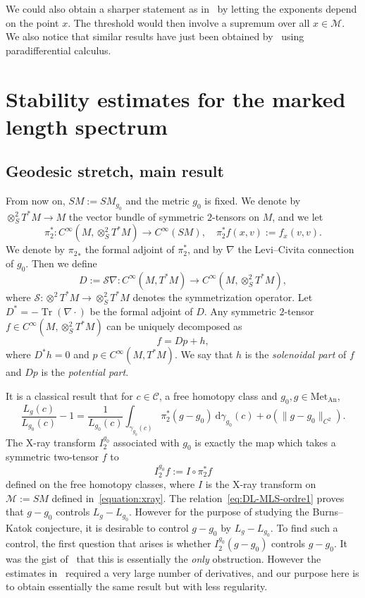 \documentclass[AHL,Unicode,longabstracts,published]{cedram}
\newcommand{\mc}{\mathcal}
\newcommand{\M}{\mathcal{M}}
\newcommand{\clS}{\mathcal{S}}
\newcommand{\dd}{\mathrm{d}}
\newcommand{\Met}{\mathrm{Met}}
\newcommand{\An}{\mathrm{An}}
\DeclareMathOperator{\Tr}{Tr}
\begin{document}
We could also obtain a sharper statement as in~\cite{Hasselblatt-92} by letting the exponents depend on the point $x$. The threshold would then involve a supremum over all $x \in \M$. We also notice that similar results have just been obtained by~\cite{Guillarmou-Poyferre-21} using paradifferential calculus.



\section{Stability estimates for the marked length spectrum}\label{section:mls}

\subsection{Geodesic stretch, main result}

From now on, $SM := SM_{g_0}$ and the metric $g_0$ is fixed. We denote by $\otimes^2_S T^*M \rightarrow M$ the vector bundle of symmetric $2$-tensors on $M$, and we let
\[
\pi_2^* : C^\infty\left(M,\otimes^2_S T^*M\right) \rightarrow C^\infty(SM),\quad\pi_2^* f(x,v) := f_x(v,v).
\]
We denote by ${\pi_2}_*$ the formal adjoint of $\pi_2^\ast$, and by $\nabla$ the Levi--Civita connection of $g_0$. Then we define
\[
D := \clS \nabla : C^\infty\left(M,T^*M\right) \rightarrow C^\infty\left(M,\otimes^2_S T^*M\right),
\]
where $\mc{S} : \otimes^2 T^*M \rightarrow \otimes^2_S T^*M$ denotes the symmetrization operator. Let $D^* = -\Tr(\nabla \cdot)$ be the formal adjoint of $D$. Any symmetric $2$-tensor $f \in C^\infty(M,\otimes^2_S T^*M)$ can be uniquely decomposed as
\[
f = Dp + h,
\]
where $D^*h = 0$ and $p \in C^\infty(M,T^*M)$. We say that $h$ is the \emph{solenoidal part} of $f$ and $Dp$ is the \emph{potential part}.


It is a classical result that for $c \in \mc{C}$, a free homotopy class and $g_0, g\in \Met_{\An}$,
\begin{equation}\label{eq:DL-MLS-ordre1}
\frac{L_g(c)}{L_{g_0}(c)} - 1 = \frac{1}{L_{g_0}(c)} \int_{\gamma_{g_0}(c)} \pi_2^\ast(g-g_0)~\dd \gamma_{g_0}(c) + o\left(\| g - g_0 \|_{C^2}\right).
\end{equation}
The X-ray transform $I_2^{g_0}$ associated with $g_0$ is exactly the map which takes a symmetric two-tensor $f$ to
\[
I_2^{g_0}f := I \circ \pi_2^* f
\]
defined on the free homotopy classes, where $I$ is the X-ray transform on $\M := SM$ defined in~\eqref{equation:xray}. The relation~\eqref{eq:DL-MLS-ordre1} proves that $g-g_0$ controls $L_g- L_{g_0}$. However for the purpose of studying the Burns--Katok conjecture, it is desirable to control $g-g_0$ by $L_g-L_{g_0}$. To find such a control, the first question that arises is whether $I^{g_0}_2 (g-g_0)$ controls $g-g_0$. It was the gist of~\cite{Guillarmou-Lefeuvre-18} that this is essentially the \emph{only} obstruction. However the estimates in~\cite{Guillarmou-Lefeuvre-18} required a very large number of derivatives, and our purpose here is to obtain essentially the same result but with less regularity.
\end{document}
